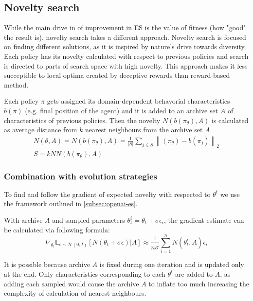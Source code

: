 \subsection{Novelty search}

While the main drive in of improvement in ES is the value of fitness (how "good" the result is), novelty search takes a different approach. Novelty search is focused on finding different solutions, as it is inspired by nature's drive towards diversity. Each policy has its novelty calculated with respect to previous policies and search is directed to parts of search space with high novelty. This approach makes it less succeptible to local optima created by deceptive rewards than reward-based method. 

Each policy $\pi$ gets assigned its domain-dependent behavorial characteristics $b(\pi)$ (e.g. final position of the agent) and it is added to an archive set $A$ of characteristics of previous policies. Then the novelty $N(b(\pi_\theta), A)$ is calculated as average distance from $k$ nearest neighbours from the archive set $A$.
\begin{equation*}
    \begin{gathered}        
    N(\theta,A) = N(b(\pi_\theta),A)=\frac{1}{\left\lvert S\right\rvert }\sum_{j\in S} \left\lVert(\pi_\theta)-b(\pi_j) \right\rVert_2  \\
    S = kNN(b(\pi_\theta),A)
\end{gathered} 
\end{equation*}
\subsubsection{Combination with evolution strategies}

To find and follow the gradient of expected novelty with respected to $\theta^t$ we use the framework outlined in \ref{subsec:openai-es}. 

With archive $A$ and sampled parameters $\theta_t^i=\theta_t + \sigma\epsilon_i$, the gradient estimate can be calculated via following formula:
\begin{equation}
    \label{nes:grad}
    \nabla_{\theta_t}\mathbb{E}_{\epsilon\sim\mathcal{N}(0,I)} [ N(\theta_t + \sigma\epsilon)|A]\approx \frac{1}{n\sigma}\sum_{i=1}^n N(\theta_t^i,A)\epsilon_i 
\end{equation}

It is possible because archive $A$ is fixed during one iteration and is updated only at the end. Only characteristics corresponding to each $\theta^t$ are added to $A$, as adding each sampled would cause the archive $A$ to inflate too much increasing the complexity of calculation of nearest-neighbours.

